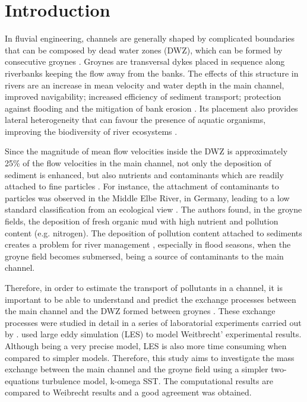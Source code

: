 \section{Introduction}
In fluvial engineering, channels are generally shaped by complicated boundaries that can be composed by dead water zones (DWZ), which can be formed by consecutive groynes \cite{xiang2019}. Groynes are transversal dykes placed in sequence along riverbanks keeping the flow away from the banks. The effects of this structure in rivers are an increase in mean velocity and water depth in the main channel, improved navigability; increased efficiency of sediment transport; protection against flooding and the mitigation of bank erosion \cite{mcCoy2008}. Its placement also provides lateral heterogeneity that can favour the presence of aquatic organisms, improving the biodiversity of river ecosystems \cite{mcCoy2008,Szlauer-ukaszewska2015,Buczynski2017,Mignot2017,Buczynska2018,xiang2019}.

Since the magnitude of mean flow velocities inside the DWZ is approximately 25\% of the flow velocities in the main channel, not only the deposition of sediment is enhanced, but also nutrients and contaminants which are readily attached to fine particles \cite{sukhodolov2014}. For instance, the attachment of contaminants to particles was observed in the Middle Elbe River, in Germany, leading to a low standard classification from an ecological view \cite{SchwartzKozerski2003}. The authors found, in the groyne fields, the deposition of fresh organic mud with high nutrient and pollution content (e.g. nitrogen). The deposition of pollution content attached to sediments creates a problem for river management \cite{uijttewaal2005}, especially in flood seasons, when the groyne field becomes submersed, being a source of contaminants to the main channel.

Therefore, in order to estimate the transport of pollutants in a channel, it is important to be able to understand and predict the exchange processes between the main channel and the DWZ formed between groynes \cite{weitbrecht2001}. These exchange processes were studied in detail in a series of laboratorial experiments carried out by \textcite{weitbrecht2004}. \textcite{Hinterberger2007} used large eddy simulation (LES) to model Weitbrecht’ experimental results. Although being a very precise model, LES is also more time consuming when compared to simpler models. Therefore, this study aims to investigate the mass exchange between the main channel and the groyne field using a simpler two-equations turbulence model, k-omega SST. The computational results are compared to Weibrecht results and a good agreement was obtained.

